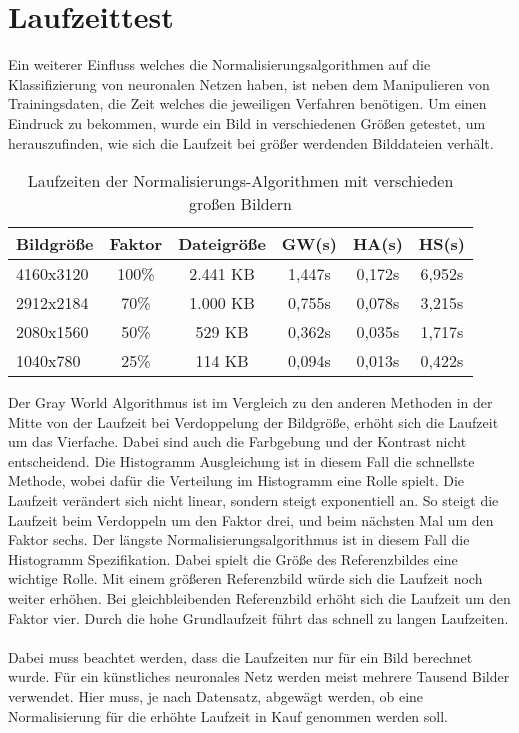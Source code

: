 \section{Laufzeittest}
Ein weiterer Einfluss welches die Normalisierungsalgorithmen auf die Klassifizierung von neuronalen Netzen haben, ist neben dem Manipulieren von Trainingsdaten, die Zeit welches die jeweiligen Verfahren benötigen. Um einen Eindruck zu bekommen, wurde ein Bild in verschiedenen Größen getestet, um herauszufinden, wie sich die Laufzeit bei größer werdenden Bilddateien verhält.
\begin{table}
[h]
\caption{Laufzeiten der Normalisierungs-Algorithmen mit verschieden großen Bildern}
\centering
\begin{tabular}{|l|c|c|c|c|c|}
\hline
Bildgröße & Faktor & Dateigröße & GW(s) & HA(s) & HS(s)\\
\hline
4160x3120 & 100\% & 2.441 KB & 1,447s & 0,172s & 6,952s\\
2912x2184 & 70\% & 1.000 KB & 0,755s & 0,078s & 3,215s\\
2080x1560 & 50\% & 529 KB & 0,362s & 0,035s & 1,717s\\
1040x780 & 25\% & 114 KB & 0,094s & 0,013s & 0,422s\\
\hline
\end{tabular}
\end{table}
Der Gray World Algorithmus ist im Vergleich zu den anderen Methoden in der Mitte von der Laufzeit bei Verdoppelung der Bildgröße, erhöht sich die Laufzeit um das Vierfache. Dabei sind auch die Farbgebung und der Kontrast nicht entscheidend. Die Histogramm Ausgleichung ist in diesem Fall die schnellste Methode, wobei dafür die Verteilung im Histogramm eine Rolle spielt. Die Laufzeit verändert sich nicht linear, sondern steigt exponentiell an. So steigt die Laufzeit beim Verdoppeln um den Faktor drei, und beim nächsten Mal um den Faktor sechs. Der längste Normalisierungsalgorithmus ist in diesem Fall die Histogramm Spezifikation. Dabei spielt die Größe des Referenzbildes eine wichtige Rolle. Mit einem größeren Referenzbild würde sich die Laufzeit noch weiter erhöhen. Bei gleichbleibenden Referenzbild erhöht sich die Laufzeit um den Faktor vier. Durch die hohe Grundlaufzeit führt das schnell zu langen Laufzeiten.\\\\
Dabei muss beachtet werden, dass die Laufzeiten nur für ein Bild berechnet wurde. Für ein künstliches neuronales Netz werden meist mehrere Tausend Bilder verwendet. Hier muss, je nach Datensatz, abgewägt werden, ob eine Normalisierung für die erhöhte Laufzeit in Kauf genommen werden soll.  